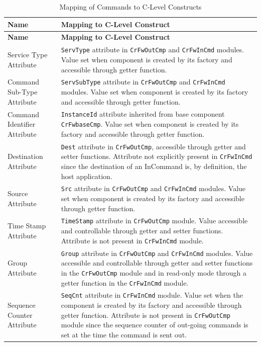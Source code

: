 \documentclass[a4paper,10pt]{article}
\begin{document}
\begin{longtable}{|>{\raggedright}p{2.0cm}|p{9.3cm}|}
\caption{Mapping of Commands to C-Level Constructs} \label{tab:CmdConceptMapping}\\
\hline
\rowcolor{light-gray}
\textbf{Name} & \textbf{Mapping to C-Level Construct} \\
\hline\hline
\endfirsthead
\rowcolor{light-gray}
\textbf{Name} & \textbf{Mapping to C-Level Construct} \\
\hline\hline
\endhead
Service Type Attribute & \texttt{ServType} attribute in \texttt{CrFwOutCmp} and \texttt{CrFwInCmd} modules. Value set when component is created by its factory and accessible through getter function. \\
\hline
Command Sub-Type Attribute & \texttt{ServSubType} attribute in \texttt{CrFwOutCmp} and \texttt{CrFwInCmd} modules. Value set when component is created by its factory and accessible through getter function. \\
\hline
Command Identifier Attribute & \texttt{InstanceId} attribute inherited from base component \texttt{CrFwbaseCmp}. Value set when component is created by its factory and accessible through getter function. \\
\hline
Destination Attribute & \texttt{Dest} attribute in \texttt{CrFwOutCmp}, accessible through getter and setter functions. Attribute not explicitly present in \texttt{CrFwInCmd} since the destination of an InCommand is, by definition, the host application. \\
\hline
Source Attribute & \texttt{Src} attribute in \texttt{CrFwOutCmp} and \texttt{CrFwInCmd} modules. Value set when component is created by its factory and accessible through getter function. \\
\hline
Time Stamp Attribute & \texttt{TimeStamp} attribute in \texttt{CrFwOutCmp} module. Value accessible and controllable through getter and setter functions. Attribute is not present in \texttt{CrFwInCmd} module. \\
\hline
Group Attribute & \texttt{Group} attribute in \texttt{CrFwOutCmp} and \texttt{CrFwInCmd} modules. Value accessible and controllable through getter and setter functions in the \texttt{CrFwOutCmp} module and in read-only mode through a getter function in the \texttt{CrFwInCmd} module.  \\
\hline
Sequence Counter Attribute & \texttt{SeqCnt} attribute in \texttt{CrFwInCmd} module. Value set when the component is created by its factory and accessible through getter function. Attribute is not present in \texttt{CrFwOutCmp} module since the sequence counter of out-going commands is set at the time the command is sent out. \\

\end{longtable}
\end{document}
